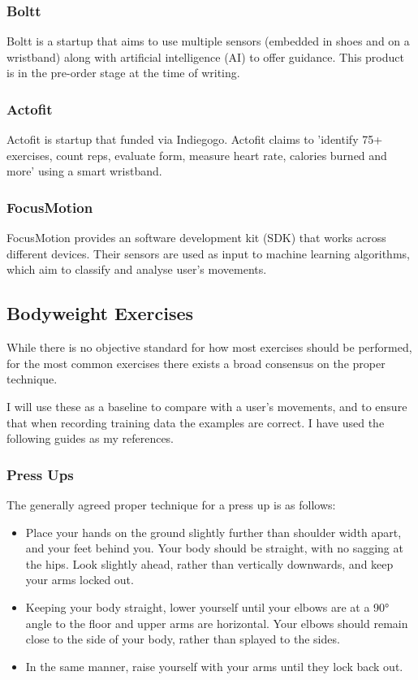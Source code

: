 \documentclass[a4paper]{article}
\begin{document}
\subsubsection{Boltt}

Boltt\cite{bgref12} is a startup that aims to use multiple sensors (embedded in shoes and on a wristband) along with artificial intelligence (AI) to offer guidance. This product is in the pre-order stage at the time of writing.

\subsubsection{Actofit}

Actofit\cite{bgref13} is startup that funded via Indiegogo\cite{bgref14}. Actofit claims to 'identify 75+ exercises, count reps, evaluate form, measure heart rate, calories burned and more' using a smart wristband.

\subsubsection{FocusMotion}

FocusMotion\cite{bgref15} provides an software development kit (SDK) that works across different devices. Their sensors are used as input to machine learning algorithms, which aim to classify and analyse user's movements.

\subsection{Bodyweight Exercises}%
\label{subsec:bg_exercises}

While there is no objective standard for how most exercises should be performed, for the most common exercises there exists a broad consensus on the proper technique.

I will use these as a baseline to compare with a user's movements, and to ensure that when recording training data the examples are correct. I have used the following guides as my references.

\subsubsection{Press Ups}

The generally agreed proper technique for a press up is as follows:

\begin{itemize}
    \item Place your hands on the ground slightly further than shoulder width apart, and your feet behind you. Your body should be straight, with no sagging at the hips. Look slightly ahead, rather than vertically downwards, and keep your arms locked out.
    \item Keeping your body straight, lower yourself until your elbows are at a 90° angle to the floor and upper arms are horizontal. Your elbows should remain close to the side of your body, rather than splayed to the sides.
    \item In the same manner, raise yourself with your arms until they lock back out.
\end{itemize}
\end{document}
